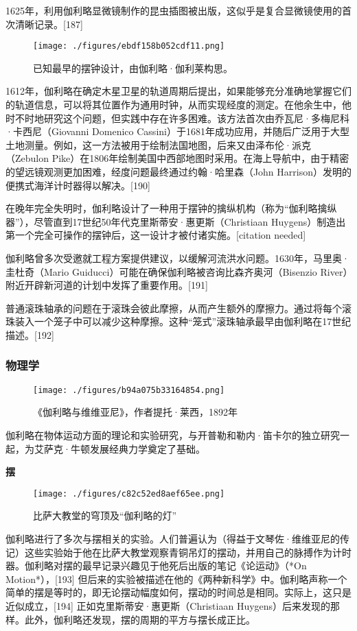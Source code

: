 1625年，利用伽利略显微镜制作的昆虫插图被出版，这似乎是复合显微镜使用的首次清晰记录。[187]  
\begin{figure}[ht]
\centering
\texttt{[image: ./figures/ebdf158b052cdf11.png]}
\caption{已知最早的摆钟设计，由伽利略·伽利莱构思。} \label{fig_JLL_15}
\end{figure}
1612年，伽利略在确定木星卫星的轨道周期后提出，如果能够充分准确地掌握它们的轨道信息，可以将其位置作为通用时钟，从而实现经度的测定。在他余生中，他时不时地研究这个问题，但实践中存在许多困难。该方法首次由乔瓦尼·多梅尼科·卡西尼（Giovanni Domenico Cassini）于1681年成功应用，并随后广泛用于大型土地测量。例如，这一方法被用于绘制法国地图，后来又由泽布伦·派克（Zebulon Pike）在1806年绘制美国中西部地图时采用。在海上导航中，由于精密的望远镜观测更加困难，经度问题最终通过约翰·哈里森（John Harrison）发明的便携式海洋计时器得以解决。[190]  

在晚年完全失明时，伽利略设计了一种用于摆钟的擒纵机构（称为“伽利略擒纵器”），尽管直到17世纪50年代克里斯蒂安·惠更斯（Christiaan Huygens）制造出第一个完全可操作的摆钟后，这一设计才被付诸实施。[citation needed]  

伽利略曾多次受邀就工程方案提供建议，以缓解河流洪水问题。1630年，马里奥·圭杜奇（Mario Guiducci）可能在确保伽利略被咨询比森齐奥河（Bisenzio River）附近开辟新河道的计划中发挥了重要作用。[191]  

普通滚珠轴承的问题在于滚珠会彼此摩擦，从而产生额外的摩擦力。通过将每个滚珠装入一个笼子中可以减少这种摩擦。这种“笼式”滚珠轴承最早由伽利略在17世纪描述。[192]
\subsubsection{物理学}
\begin{figure}[ht]
\centering
\texttt{[image: ./figures/b94a075b33164854.png]}
\caption{《伽利略与维维亚尼》，作者提托·莱西，1892年} \label{fig_JLL_16}
\end{figure}
伽利略在物体运动方面的理论和实验研究，与开普勒和勒内·笛卡尔的独立研究一起，为艾萨克·牛顿发展经典力学奠定了基础。

\textbf{摆}  
\begin{figure}[ht]
\centering
\texttt{[image: ./figures/c82c52ed8aef65ee.png]}
\caption{比萨大教堂的穹顶及“伽利略的灯”} \label{fig_JLL_17}
\end{figure}
伽利略进行了多次与摆相关的实验。人们普遍认为（得益于文琴佐·维维亚尼的传记）这些实验始于他在比萨大教堂观察青铜吊灯的摆动，并用自己的脉搏作为计时器。伽利略对摆的最早记录兴趣见于他死后出版的笔记《论运动》（*On Motion*），[193] 但后来的实验被描述在他的《两种新科学》中。伽利略声称一个简单的摆是等时的，即无论摆动幅度如何，摆动的时间总是相同。实际上，这只是近似成立，[194] 正如克里斯蒂安·惠更斯（Christiaan Huygens）后来发现的那样。此外，伽利略还发现，摆的周期的平方与摆长成正比。

